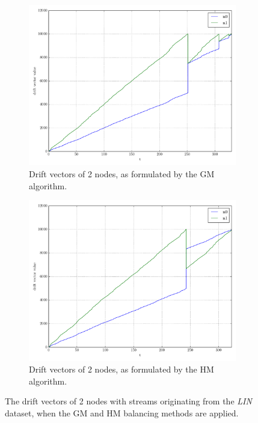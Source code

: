 \begin{figure}[!htb]
\begin{subfigure}{0.49\textwidth}
  \includegraphics[width=\linewidth]{img/bal_classic_drifts_linear2N.pdf}
  \caption{Drift vectors of 2 nodes, as formulated by the GM algorithm.}
\end{subfigure}\hfill
\begin{subfigure}{0.49\textwidth}
  \includegraphics[width=\linewidth]{img/bal_heuristic_drifts_linear2N.pdf}
  \caption{Drift vectors of 2 nodes, as formulated by the HM algorithm.}
\end{subfigure}\hfill
\vspace{0.5cm}
\caption{The drift vectors of 2 nodes with streams originating from the \emph{LIN} dataset, when the GM and HM balancing methods are applied.} \label{fig:balComp-drifts}
\end{figure}

